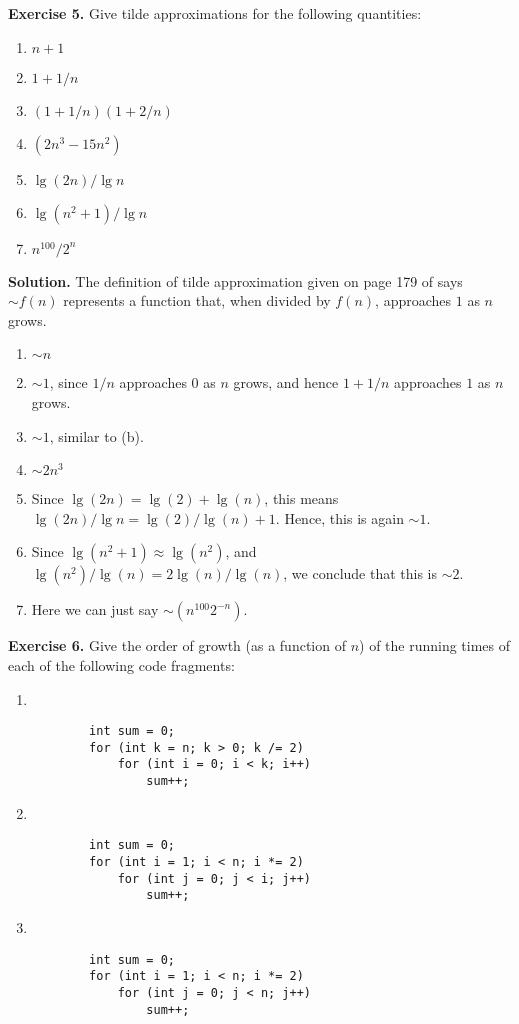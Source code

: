 \documentclass[12pt, a4paper]{article}
\newenvironment{ex}[2][Exercise]
{\par\medskip\noindent \textbf{#1 #2.}}
{\medskip}
\newenvironment{sol}[1][Solution]
{\par\medskip\noindent \textbf{#1.} }
{\medskip}
\begin{document}
	\begin{ex}{5}
		Give tilde approximations for the following quantities:
		\begin{enumerate}[label=(\alph*)]
			\item $n+1$
			\item $1 + 1/n$
			\item $(1 + 1/n)(1+2/n)$
			\item $(2n^3-15n^2)$
			\item $\lg(2n) / \lg n$
			\item $\lg(n^2+1) / \lg n$
			\item $n^{100}/2^n$
		\end{enumerate}
	\end{ex}
	\begin{sol}
		The definition of tilde approximation given on page 179 of \cite{sedgewick_wayne} says
		$\sim f(n)$ represents a function that, when divided by $f(n)$, approaches $1$ as $n$ grows.
		\begin{enumerate}[label=(\alph*)]
			\item $\sim n$
			\item $\sim 1$, since $1/n$ approaches $0$ as $n$ grows, and hence $1 + 1/n$ approaches
			$1$ as $n$ grows.
			\item $\sim 1$, similar to (b).
			\item $\sim 2n^3$
			\item Since $\lg(2n) = \lg(2) + \lg(n)$, this means $\lg(2n)/\lg n = \lg(2) / \lg(n) + 1$.
			Hence, this is again $\sim 1$.
			\item Since $\lg(n^2 + 1) \approx \lg(n^2)$, and $\lg(n^2) / \lg(n) = 2\lg(n)/\lg(n)$,
			we conclude that this is $\sim 2$.
			\item Here we can just say $\sim (n^{100}2^{-n})$.
		\end{enumerate}
	\end{sol}
	\begin{ex}{6}
		Give the order of growth (as a function of $n$) of the running times of each
		of the following code fragments:
		\begin{enumerate}[label=(\alph*)]
			\item
			\
			\begin{lstlisting}
		int sum = 0;
		for (int k = n; k > 0; k /= 2)
			for (int i = 0; i < k; i++)
				sum++;
			\end{lstlisting}
			\item
			\
			\begin{lstlisting}
		int sum = 0;
		for (int i = 1; i < n; i *= 2)
			for (int j = 0; j < i; j++)
				sum++;
			\end{lstlisting}
			\item
			\
			\begin{lstlisting}
		int sum = 0;
		for (int i = 1; i < n; i *= 2)
			for (int j = 0; j < n; j++)
				sum++;
			\end{lstlisting}
		\end{enumerate}
	\end{ex}
\end{document}
